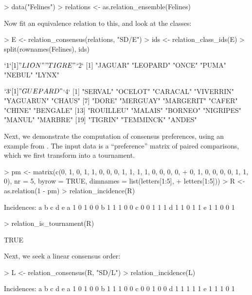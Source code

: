 \documentclass[fleqn]{article}
\newcommand{\dQuote}[1]{``{#1}''}
\begin{document}
\begin{Schunk}
\begin{Sinput}
> data("Felines")
> relations <- as.relation_ensemble(Felines)
\end{Sinput}
\end{Schunk}
Now fit an equivalence relation to this, and look at the classes:
\begin{Schunk}
\begin{Sinput}
> E <- relation_consensus(relations, "SD/E")
> ids <- relation_class_ids(E)
> split(rownames(Felines), ids)
\end{Sinput}
\begin{Soutput}
$`1`
[1] "LION"  "TIGRE"

$`2`
[1] "JAGUAR"  "LEOPARD" "ONCE"    "PUMA"    "NEBUL"   "LYNX"   

$`3`
[1] "GUEPARD"

$`4`
 [1] "SERVAL"   "OCELOT"   "CARACAL"  "VIVERRIN" "YAGUARUN" "CHAUS"   
 [7] "DORE"     "MERGUAY"  "MARGERIT" "CAFER"    "CHINE"    "BENGALE" 
[13] "ROUILLEU" "MALAIS"   "BORNEO"   "NIGRIPES" "MANUL"    "MARBRE"  
[19] "TIGRIN"   "TEMMINCK" "ANDES"   
\end{Soutput}
\end{Schunk}
Next, we demonstrate the computation of consensus preferences, using an
example from
\citet[pp.~48ff]{ranking:Cook+Kress:1992}.  The input data is a
\dQuote{preference} matrix of paired comparisons, which we first
transform into a tournament.
\begin{Schunk}
\begin{Sinput}
> pm <- matrix(c(0, 1, 0, 1, 1, 0, 0, 0, 1, 1, 1, 1, 0, 0, 0, 0, 
+     0, 1, 0, 0, 0, 0, 1, 1, 0), nr = 5, byrow = TRUE, dimnames = list(letters[1:5], 
+     letters[1:5]))
> R <- as.relation(1 - pm)
> relation_incidence(R)
\end{Sinput}
\begin{Soutput}
Incidences:
  a b c d e
a 1 0 1 0 0
b 1 1 1 0 0
c 0 0 1 1 1
d 1 1 0 1 1
e 1 1 0 0 1
\end{Soutput}
\begin{Sinput}
> relation_is_tournament(R)
\end{Sinput}
\begin{Soutput}
[1] TRUE
\end{Soutput}
\end{Schunk}
Next, we seek a linear consensus order:
\begin{Schunk}
\begin{Sinput}
> L <- relation_consensus(R, "SD/L")
> relation_incidence(L)
\end{Sinput}
\begin{Soutput}
Incidences:
  a b c d e
a 1 0 1 0 0
b 1 1 1 0 0
c 0 0 1 0 0
d 1 1 1 1 1
e 1 1 1 0 1
\end{Soutput}
\end{Schunk}
\end{document}
